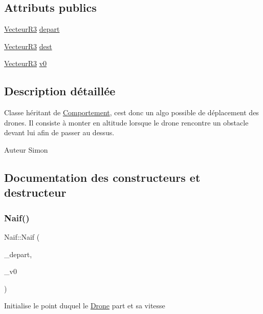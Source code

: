 \subsection*{Attributs publics}
\begin{DoxyCompactItemize}
\item 
\mbox{\hyperlink{class_vecteur_r3}{Vecteur\+R3}} \mbox{\hyperlink{class_naif_a0fde7dd2f98b4c8f163866ba7cd7d489}{depart}}
\item 
\mbox{\hyperlink{class_vecteur_r3}{Vecteur\+R3}} \mbox{\hyperlink{class_naif_a330eb7baf76efe3f36b7779669cccf64}{dest}}
\item 
\mbox{\hyperlink{class_vecteur_r3}{Vecteur\+R3}} \mbox{\hyperlink{class_naif_a11d7d76e77efcb9a2f47c4154bbfd55e}{v0}}
\end{DoxyCompactItemize}


\subsection{Description détaillée}
Classe héritant de \mbox{\hyperlink{class_comportement}{Comportement}}, c\textquotesingle{}est donc un algo possible de déplacement des drones. Il consiste à monter en altitude lorsque le drone rencontre un obstacle devant lui afin de passer au dessus.

\begin{DoxyAuthor}{Auteur}
Simon 
\end{DoxyAuthor}


\subsection{Documentation des constructeurs et destructeur}
\mbox{\label{class_naif_acc816dcabca7caddbb282ec1bd232505}} 
\subsubsection{\texorpdfstring{Naif()}{Naif()}}
{\footnotesize\ttfamily Naif\+::\+Naif (\begin{DoxyParamCaption}\item[{const \mbox{\hyperlink{class_vecteur_r3}{Vecteur\+R3}}}]{\+\_\+depart,  }\item[{const \mbox{\hyperlink{class_vecteur_r3}{Vecteur\+R3}}}]{\+\_\+v0 }\end{DoxyParamCaption})}

Initialise le point duquel le \mbox{\hyperlink{class_drone}{Drone}} part et sa vitesse 

